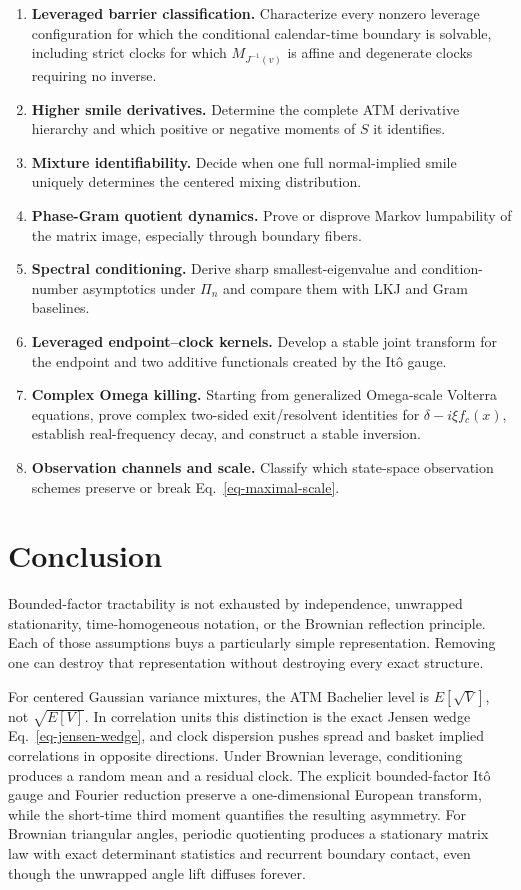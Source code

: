 \documentclass[
  english,
  11pt,
  letterpaper,
  DIV=11,
  numbers=noendperiod]{scrartcl}
\providecommand{\tightlist}{%
  \setlength{\itemsep}{0pt}\setlength{\parskip}{0pt}}
\theoremstyle{plain}
\theoremstyle{plain}
\theoremstyle{plain}
\theoremstyle{plain}
\theoremstyle{remark}
\begin{document}
\begin{enumerate}
\def\labelenumi{\arabic{enumi}.}
\tightlist
\item
  \textbf{Leveraged barrier classification.} Characterize every nonzero
  leverage configuration for which the conditional calendar-time
  boundary is solvable, including strict clocks for which
  \(M_{J^{-1}(v)}\) is affine and degenerate clocks requiring no
  inverse.
\item
  \textbf{Higher smile derivatives.} Determine the complete ATM
  derivative hierarchy and which positive or negative moments of \(S\)
  it identifies.
\item
  \textbf{Mixture identifiability.} Decide when one full normal-implied
  smile uniquely determines the centered mixing distribution.
\item
  \textbf{Phase-Gram quotient dynamics.} Prove or disprove Markov
  lumpability of the matrix image, especially through boundary fibers.
\item
  \textbf{Spectral conditioning.} Derive sharp smallest-eigenvalue and
  condition- number asymptotics under \(\Pi_n\) and compare them with
  LKJ and Gram baselines.
\item
  \textbf{Leveraged endpoint--clock kernels.} Develop a stable joint
  transform for the endpoint and two additive functionals created by the
  Itô gauge.
\item
  \textbf{Complex Omega killing.} Starting from generalized Omega-scale
  Volterra equations, prove complex two-sided exit/resolvent identities
  for \(\delta-i\xi f_c(x)\), establish real-frequency decay, and
  construct a stable inversion.
\item
  \textbf{Observation channels and scale.} Classify which state-space
  observation schemes preserve or break Eq.~\ref{eq-maximal-scale}.
\end{enumerate}

\section{Conclusion}\label{sec-conclusion}

Bounded-factor tractability is not exhausted by independence, unwrapped
stationarity, time-homogeneous notation, or the Brownian reflection
principle. Each of those assumptions buys a particularly simple
representation. Removing one can destroy that representation without
destroying every exact structure.

For centered Gaussian variance mixtures, the ATM Bachelier level is
\(E[\sqrt V]\), not \(\sqrt{E[V]}\). In correlation units this
distinction is the exact Jensen wedge Eq.~\ref{eq-jensen-wedge}, and
clock dispersion pushes spread and basket implied correlations in
opposite directions. Under Brownian leverage, conditioning produces a
random mean and a residual clock. The explicit bounded-factor Itô gauge
and Fourier reduction preserve a one-dimensional European transform,
while the short-time third moment quantifies the resulting asymmetry.
For Brownian triangular angles, periodic quotienting produces a
stationary matrix law with exact determinant statistics and recurrent
boundary contact, even though the unwrapped angle lift diffuses forever.
\end{document}
